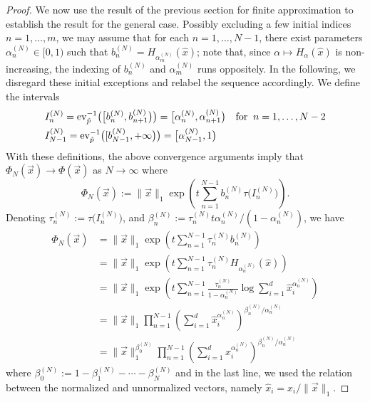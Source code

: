 \documentclass[aps,pra,11pt,onecolumn,nofootinbib,tightenlines]{revtex4-2}
\theoremstyle{definition}
\begin{document}
\begin{proof}
We now use the result of the previous section for finite approximation to establish the result for the general case.
Possibly excluding a few initial indices $n = 1, \ldots, m$, we may assume that for each $n = 1, \ldots, N - 1$, there exist parameters $\alpha^{(N)}_n \in [0,1)$ such that $b^{(N)}_n = H_{\alpha^{(N)}_m}(\hat{x})$; note that, since $\alpha\mapsto H_\alpha(\hat{x})$ is non-increasing, the indexing of $b^{(N)}_n$ and $\alpha^{(N)}_m$ runs oppositely. In the following, we disregard these initial exceptions and relabel the sequence accordingly. We define the intervals
\begin{align}
    &I^{(N)}_{n}={\rm ev}_{\hat{p}}^{-1}\big(\big[b^{(N)}_n,b^{(N)}_{n+1}\big)\big)=\big[\alpha^{(N)}_n,\alpha^{(N)}_{n+1}\big) \quad \text{for} \;\; n=1,\ldots,N-2 \\
    & I^{(N)}_{N-1} = {\rm ev}_{\hat{p}}^{-1}\big([b^{(N)}_{N-1},+\infty\big)\big)=\big[\alpha^{(N)}_{N-1},1\big)
\end{align}
With these definitions, the above convergence arguments imply that $\Phi_N(\vec{x})\to\Phi(\vec{x})$ as $N\to\infty$ where
\begin{equation}
\Phi_N(\vec{x}):=\|\vec{x}\|_1\exp{\left(t\sum_{n=1}^{N-1}b_n^{(N)}\tau\big(I^{(N)}_n\big)\right)}.
\end{equation}
Denoting $\tau^{(N)}_n:=\tau\big(I^{(N)}_n\big)$, and $\beta^{(N)}_n:=\tau^{(N)}_nt\alpha^{(N)}_n/(1-\alpha^{(N)}_n)$, we have
\begin{align}
\Phi_N(\vec{x})&=\|\vec{x}\|_1\exp{\left(t\sum_{n=1}^{N-1}\tau^{(N)}_n b^{(N)}_n\right)}\\
&=\|\vec{x}\|_1\exp{\left(t\sum_{n=1}^{N-1}\tau^{(N)}_n H_{\alpha^{(N)}_n}(\hat{x})\right)}\\
&=\|\vec{x}\|_1\exp{\left(t\sum_{n=1}^{N-1}\frac{\tau^{(N)}_n}{1-\alpha^{(N)}_n}\log{\sum_{i=1}^d\hat{x}_i^{\alpha^{(N)}_n}}\right)}\\
&=\|\vec{x}\|_1\prod_{n=1}^{N-1}\left(\sum_{i=1}^d\hat{x}_i^{\alpha^{(N)}_n}\right)^{\beta^{(N)}_n/\alpha^{(N)}_n}\\
&=\|\vec{x}\|_1^{\beta^{(N)}_0}\prod_{n=1}^{N-1}\left(\sum_{i=1}^d x_i^{\alpha^{(N)}_n}\right)^{\beta^{(N)}_n/\alpha^{(N)}_n}\label{eq:PhiN}
\end{align}
where $\beta_0^{(N)}:=1-\beta^{(N)}_1-\cdots-\beta^{(N)}_N$ and in the last line, we used the relation between the normalized and unnormalized vectors, namely $\hat{x}_i = x_i / \|\vec{x}\|_1$.


\end{proof}
\end{document}
